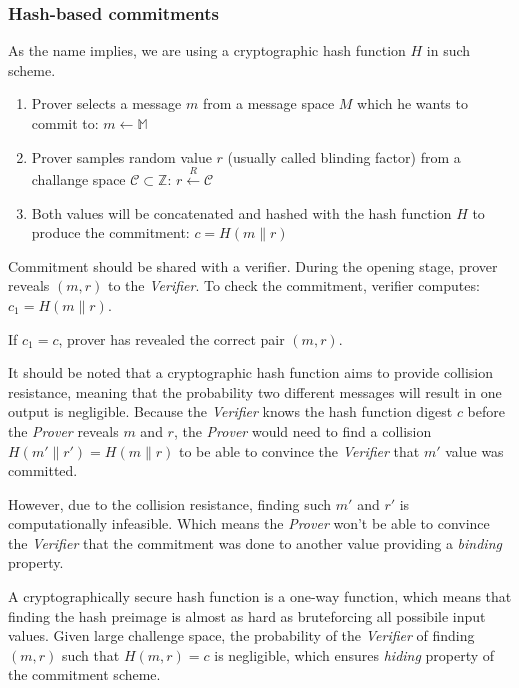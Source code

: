 \documentclass[../lecture-notes.tex]{subfiles}
\begin{document}
\subsubsection{Hash-based commitments}

As the name implies, we are using a cryptographic hash function \(H\) in such scheme.

\begin{enumerate}
    \item Prover selects a message $m$ from a message space $M$ which he wants to commit to:
        $m \leftarrow \mathbb{M}$

    \item Prover samples random value $r$ (usually called blinding factor) from a challange space $\mathcal{C} \subset \mathbb{Z}$:
        $r \xleftarrow{R} \mathcal{C}$
    
    \item Both values will be concatenated and hashed with the hash function $H$ to produce the commitment:
        $c = H(m \parallel r)$

\end{enumerate}

Commitment should be shared with a verifier. During the opening stage, prover reveals $(m, r)$ to the \textit{Verifier}. 
To check the commitment, verifier computes: $c_1 = H(m \parallel r)$.

If $c_1 = c$, prover has revealed the correct pair $(m, r)$.

It should be noted that a cryptographic hash function aims to provide collision resistance, 
meaning that the probability two different messages will result in one output is negligible.
Because the \textit{Verifier} knows the hash function digest $c$ before the \textit{Prover} reveals $m$ and $r$, 
the \textit{Prover} would need to find a collision $H(m' \parallel r') = H(m \parallel r)$ to be able to convince the \textit{Verifier}
that $m'$ value was committed.

However, due to the collision resistance, finding such $m'$ and $r'$ is computationally infeasible. Which means the \textit{Prover}
won't be able to convince the \textit{Verifier} that the commitment was done to another value providing a \textit{binding} property.

A cryptographically secure hash function is a one-way function, which means that finding the hash preimage is almost as hard as bruteforcing
all possibile input values. Given large challenge space, the probability of the \textit{Verifier} of finding $(m, r)$ such that
$H(m, r) = c$ is negligible, which ensures \textit{hiding} property of the commitment scheme. 
\end{document}
